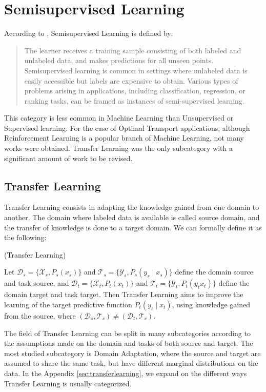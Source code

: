 
\section{Semisupervised Learning}
According to \citet{mohri2018foundations}, Semisupervised Learning is defined by:
\blockquote{The learner receives a training sample consisting of both labeled and unlabeled data,
  and makes predictions for all unseen points. Semisupervised learning is common in settings where
  unlabeled data is easily
  accessible but labels are expensive to obtain. Various types of problems arising
  in applications, including classification, regression, or ranking tasks, can be framed
  as instances of
  semi-supervised learning.}

This category is less common in Machine Learning than Unsupervised or Supervised learning.
For the case of Optimal Transport applications,
although Reinforcement Learning is a popular
branch of Machine Learning, not many works were obtained.
Transfer Learning was the only subcategory with a significant amount of work to be revised. 

\subsection{Transfer Learning}

Transfer Learning consists in adapting the knowledge gained from one domain to another. The
domain where labeled data is available is called source domain, and the transfer of knowledge is done
to a target domain. We can formally define it as the following:

\begin{definition}{(Transfer Learning)}

Let
$\mathcal D_s = \{\mathcal X_s, P_s(x_s)\}$ and
$\mathcal T_s = \{\mathcal Y_s, P_s(y_s \mid x_s)\}$
define the domain source and task source, and 
$\mathcal D_t = \{\mathcal X_t, P_t(x_t)\}$ and
$\mathcal T_t = \{\mathcal Y_t, P_t(y_t x_t)\}$
define the domain target and task target.
Then Transfer Learning aims to improve the learning of the
target predictive function $P_t(y_t \mid x_t)$, using knowledge gained
from the source, where $(\mathcal D_s, \mathcal T_s) \neq (\mathcal D_t, \mathcal T_s)$.
\end{definition}

The field of Transfer Learning can be split in many subcategories according to the assumptions
made on the domain and tasks of both source and target.
The most studied subcategory is Domain Adaptation, where the source and
target are assumed to share the same task, but have different marginal distributions on the data.
In the Appendix \ref{sec:transferlearning}, we expand on the different ways Transfer Learning
is usually categorized.

